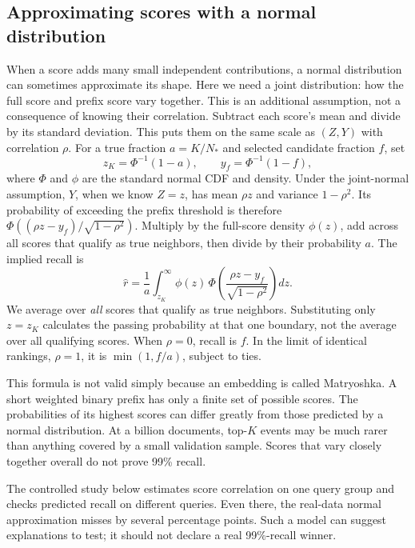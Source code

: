\subsection{Approximating scores with a normal distribution}
When a score adds many small independent contributions, a normal distribution can sometimes
approximate its shape. Here we need a joint distribution: how the full score and prefix score
vary together. This is an additional assumption, not a consequence of knowing their correlation. Subtract each score's mean and divide by its standard deviation. This puts them on the same scale as $(Z,Y)$ with correlation $\rho$. For a true
fraction $a=K/N_*$ and selected candidate fraction $f$, set
\[
z_K=\Phi^{-1}(1-a),\qquad y_f=\Phi^{-1}(1-f),
\]
where $\Phi$ and $\phi$ are the standard normal CDF and density. Under the joint-normal assumption, $Y$, when we know $Z=z$, has mean $\rho z$ and variance
$1-\rho^2$. Its probability of exceeding the prefix threshold is therefore
$\Phi((\rho z-y_f)/\sqrt{1-\rho^2})$. Multiply by the full-score density $\phi(z)$,
add across all scores that qualify as true neighbors, then divide by their probability $a$. The implied recall is
\begin{equation}
\widehat r=
\frac{1}{a}\int_{z_K}^{\infty}
\phi(z)\,\Phi\!\left(\frac{\rho z-y_f}{\sqrt{1-\rho^2}}\right)dz.
\label{eq:normal-recall}
\end{equation}
We average over \emph{all} scores that qualify as true neighbors. Substituting only $z=z_K$ calculates the passing probability at that one boundary,
not the average over all qualifying scores. When $\rho=0$, recall is $f$. In the limit of
identical rankings, $\rho=1$, it is $\min(1,f/a)$, subject to ties.

This formula is not valid simply because an embedding is called Matryoshka. A short weighted
binary prefix has only a finite set of possible scores. The probabilities of its highest scores can differ greatly
from those predicted by a normal distribution. At a billion documents, top-$K$ events may be much rarer than
anything covered by a small validation sample. Scores that vary closely together overall do not prove 99\% recall.

The controlled study below estimates score correlation on one query group and checks predicted
recall on different queries. Even there, the real-data normal approximation misses by several
percentage points. Such a model can suggest explanations to test; it should not declare a real
99\%-recall winner.

